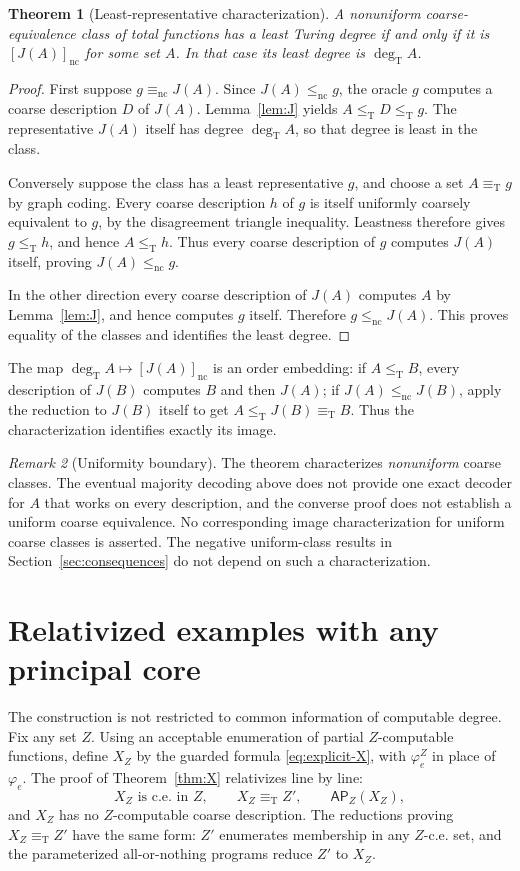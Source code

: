 \documentclass[11pt,a4paper]{article}
\newcommand{\leT}{\leq_{\mathrm T}}
\newcommand{\eqT}{\equiv_{\mathrm T}}
\newcommand{\degT}{\operatorname{deg}_{\mathrm T}}
\newcommand{\nc}{\mathrm{nc}}
\newcommand{\AP}{\mathsf{AP}}
\newtheorem{theorem}{Theorem}[section]
\theoremstyle{definition}\newtheorem{definition}[theorem]{Definition}
\theoremstyle{remark}\newtheorem{remark}[theorem]{Remark}
\begin{document}
\begin{theorem}[Least-representative characterization]\label{thm:leastclass}
A nonuniform coarse-equivalence class of total functions has a least Turing
degree if and only if it is $[J(A)]_{\nc}$ for some set $A$. In that case its
least degree is $\degT A$.
\end{theorem}
\begin{proof}
First suppose $g\equiv_{\nc}J(A)$. Since $J(A)\le_{\nc}g$, the oracle $g$
computes a coarse description $D$ of $J(A)$. Lemma~\ref{lem:J} yields
$A\leT D\leT g$. The representative $J(A)$ itself has degree $\degT A$, so
that degree is least in the class.

Conversely suppose the class has a least representative $g$, and choose a
set $A\eqT g$ by graph coding. Every coarse description $h$ of $g$ is itself
uniformly coarsely equivalent to $g$, by the disagreement triangle inequality.
Leastness therefore gives $g\leT h$, and hence $A\leT h$. Thus every coarse
description of $g$ computes $J(A)$ itself, proving $J(A)\le_{\nc}g$.

In the other direction every coarse description of $J(A)$ computes $A$ by
Lemma~\ref{lem:J}, and hence computes $g$ itself. Therefore
$g\le_{\nc}J(A)$. This proves equality of the classes and identifies the least
degree.
\end{proof}

The map $\degT A\mapsto[J(A)]_{\nc}$ is an order embedding: if $A\leT B$,
every description of $J(B)$ computes $B$ and then $J(A)$; if
$J(A)\le_{\nc}J(B)$, apply the reduction to $J(B)$ itself to get
$A\leT J(B)\eqT B$. Thus the characterization identifies exactly its image.

\begin{remark}[Uniformity boundary]
The theorem characterizes \emph{nonuniform} coarse classes. The eventual
majority decoding above does not provide one exact decoder for $A$ that works
on every description, and the converse proof does not establish a uniform
coarse equivalence. No corresponding image characterization for uniform
coarse classes is asserted. The negative uniform-class results in
Section~\ref{sec:consequences} do not depend on such a characterization.
\end{remark}

\section{Relativized examples with any principal core}
\label{sec:relative}
The construction is not restricted to common information of computable
degree. Fix any set $Z$. Using an acceptable enumeration of partial
$Z$-computable functions, define $X_Z$ by the guarded formula
\eqref{eq:explicit-X}, with $\varphi_e^Z$ in place of $\varphi_e$. The proof of
Theorem~\ref{thm:X} relativizes line by line:
\begin{equation}\label{eq:relativeX}
 X_Z\text{ is c.e. in }Z,\qquad X_Z\eqT Z',\qquad
 \AP_Z(X_Z),
\end{equation}
and $X_Z$ has no $Z$-computable coarse description. The reductions proving
$X_Z\eqT Z'$ have the same form: $Z'$ enumerates membership in any $Z$-c.e.
set, and the parameterized all-or-nothing programs reduce $Z'$ to $X_Z$.
\end{document}
